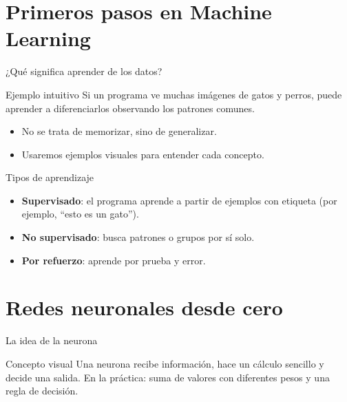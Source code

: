 \documentclass[10pt,aspectratio=169]{beamer}
\begin{document}
\section{Primeros pasos en Machine Learning}

\begin{frame}{¿Qué significa aprender de los datos?}
  \begin{block}{Ejemplo intuitivo}
    Si un programa ve muchas imágenes de gatos y perros, puede aprender a diferenciarlos observando los patrones comunes.
  \end{block}
  \begin{itemize}
    \item No se trata de memorizar, sino de generalizar.
    \item Usaremos ejemplos visuales para entender cada concepto.
  \end{itemize}
\end{frame}

\begin{frame}{Tipos de aprendizaje}
  \begin{itemize}
    \item \textbf{Supervisado}: el programa aprende a partir de ejemplos con etiqueta (por ejemplo, “esto es un gato”).
    \item \textbf{No supervisado}: busca patrones o grupos por sí solo.
    \item \textbf{Por refuerzo}: aprende por prueba y error.
  \end{itemize}
\end{frame}

\section{Redes neuronales desde cero}

\begin{frame}{La idea de la neurona}
  \begin{block}{Concepto visual}
    Una neurona recibe información, hace un cálculo sencillo y decide una salida.\newline
    En la práctica: suma de valores con diferentes pesos y una regla de decisión.
  \end{block}
\end{frame}
\end{document}

